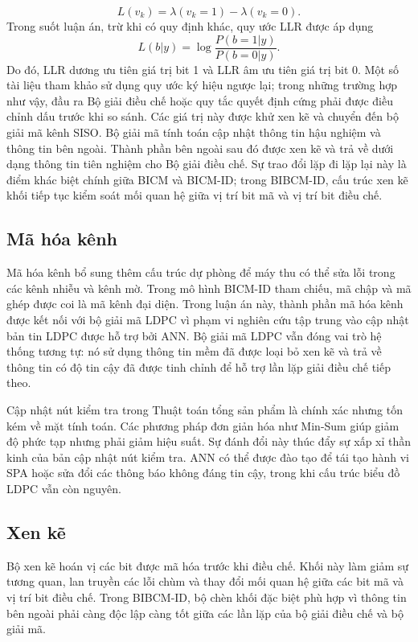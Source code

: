 \begin{equation}
L(v_k)=\lambda(v_k=1)-\lambda(v_k=0).
\end{equation}
Trong suốt luận án, trừ khi có quy định khác, quy ước LLR được áp dụng
\begin{equation*}
L(b|y)=\log\frac{P(b=1|y)}{P(b=0|y)}.
\end{equation*}
Do đó, LLR dương ưu tiên giá trị bit 1 và LLR âm ưu tiên giá trị bit 0. Một số tài liệu tham khảo sử dụng quy ước ký hiệu ngược lại; trong những trường hợp như vậy, đầu ra Bộ giải điều chế hoặc quy tắc quyết định cứng phải được điều chỉnh dấu trước khi so sánh. Các giá trị này được khử xen kẽ và chuyển đến bộ giải mã kênh SISO. Bộ giải mã tính toán cập nhật thông tin hậu nghiệm và thông tin bên ngoài. Thành phần bên ngoài sau đó được xen kẽ và trả về dưới dạng thông tin tiên nghiệm cho Bộ giải điều chế. Sự trao đổi lặp đi lặp lại này là điểm khác biệt chính giữa BICM và BICM-ID; trong BIBCM-ID, cấu trúc xen kẽ khối tiếp tục kiểm soát mối quan hệ giữa vị trí bit mã và vị trí bit điều chế.

\subsection{Mã hóa kênh}
Mã hóa kênh bổ sung thêm cấu trúc dự phòng để máy thu có thể sửa lỗi trong các kênh nhiễu và kênh mờ. Trong mô hình BICM-ID tham chiếu, mã chập và mã ghép được coi là mã kênh đại diện. Trong luận án này, thành phần mã hóa kênh được kết nối với bộ giải mã LDPC vì phạm vi nghiên cứu tập trung vào cập nhật bản tin LDPC được hỗ trợ bởi ANN. Bộ giải mã LDPC vẫn đóng vai trò hệ thống tương tự: nó sử dụng thông tin mềm đã được loại bỏ xen kẽ và trả về thông tin có độ tin cậy đã được tinh chỉnh để hỗ trợ lần lặp giải điều chế tiếp theo.

Cập nhật nút kiểm tra trong Thuật toán tổng sản phẩm là chính xác nhưng tốn kém về mặt tính toán. Các phương pháp đơn giản hóa như Min-Sum giúp giảm độ phức tạp nhưng phải giảm hiệu suất. Sự đánh đổi này thúc đẩy sự xấp xỉ thần kinh của bản cập nhật nút kiểm tra. ANN có thể được đào tạo để tái tạo hành vi SPA hoặc sửa đổi các thông báo không đáng tin cậy, trong khi cấu trúc biểu đồ LDPC vẫn còn nguyên.

\subsection{Xen kẽ}
Bộ xen kẽ hoán vị các bit được mã hóa trước khi điều chế. Khối này làm giảm sự tương quan, lan truyền các lỗi chùm và thay đổi mối quan hệ giữa các bit mã và vị trí bit điều chế. Trong BIBCM-ID, bộ chèn khối đặc biệt phù hợp vì thông tin bên ngoài phải càng độc lập càng tốt giữa các lần lặp của bộ giải điều chế và bộ giải mã.

